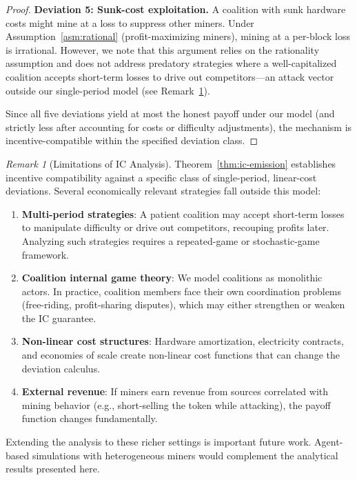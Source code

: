 \documentclass[11pt,a4paper]{article}
\theoremstyle{definition}
\theoremstyle{remark}
\newtheorem{remark}[theorem]{Remark}
\begin{document}
\begin{proof}
\textbf{Deviation 5: Sunk-cost exploitation.}
A coalition with sunk hardware costs might mine at a loss to suppress
other miners.
Under Assumption~\ref{asm:rational} (profit-maximizing miners),
mining at a per-block loss is irrational.
However, we note that this argument relies on the rationality assumption
and does not address predatory strategies where a well-capitalized
coalition accepts short-term losses to drive out competitors---an attack
vector outside our single-period model (see Remark~\ref{rem:ic-limitations}).

Since all five deviations yield at most the honest payoff under our
model (and strictly less after accounting for costs or difficulty
adjustments), the mechanism is incentive-compatible within the specified
deviation class.
\end{proof}

\begin{remark}[Limitations of IC Analysis]\label{rem:ic-limitations}
Theorem~\ref{thm:ic-emission} establishes incentive compatibility
against a specific class of single-period, linear-cost deviations.
Several economically relevant strategies fall outside this model:
\begin{enumerate}[label=(\roman*),nosep]
  \item \textbf{Multi-period strategies}: A patient coalition may accept
    short-term losses to manipulate difficulty or drive out competitors,
    recouping profits later.
    Analyzing such strategies requires a repeated-game or stochastic-game
    framework.
  \item \textbf{Coalition internal game theory}: We model coalitions as
    monolithic actors.
    In practice, coalition members face their own coordination problems
    (free-riding, profit-sharing disputes), which may either strengthen
    or weaken the IC guarantee.
  \item \textbf{Non-linear cost structures}: Hardware amortization,
    electricity contracts, and economies of scale create non-linear cost
    functions that can change the deviation calculus.
  \item \textbf{External revenue}: If miners earn revenue from sources
    correlated with mining behavior (e.g., short-selling the token
    while attacking), the payoff function changes fundamentally.
\end{enumerate}
Extending the analysis to these richer settings is important future work.
Agent-based simulations with heterogeneous miners would complement the
analytical results presented here.
\end{remark}
\end{document}
